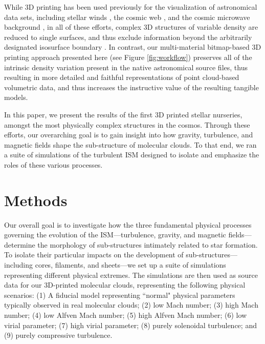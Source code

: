 \documentclass[twocolumn]{aastex63}
\begin{document}
While 3D printing has been used previously for the visualization of astronomical data sets, including stellar winds \citep{Madura_2015}, the cosmic web \citep{Diemer_2017}, and the cosmic microwave background \citep{Clements_2017},  in all of these efforts, complex 3D structures of variable density are reduced to single surfaces, and thus exclude information beyond the arbitrarily designated isosurface boundary \citep{hosny_2018}.  In contrast, our multi-material bitmap-based 3D printing approach presented here (see Figure \ref{fig:workflow}) preserves all of the intrinsic density variation present in the native astronomical source files, thus resulting in more detailed and faithful representations of point cloud-based volumetric data, and thus increases the instructive value of the resulting tangible models.

 
In this paper, we present the results of the first 3D printed stellar nurseries, amongst the most physically complex structures in the cosmos. Through these efforts, our overarching goal is to gain insight into how gravity, turbulence, and magnetic fields shape the sub-structure of molecular clouds.  To that end, we ran a suite of simulations of the turbulent ISM designed to isolate and emphasize the roles of these various processes. 



\section{Methods}\label{sec:methods}

Our overall goal is to investigate how the three fundamental physical processes governing the evolution of the ISM---turbulence, gravity, and magnetic fields---determine the morphology of sub-structures intimately related to star formation.   To isolate their particular impacts on the development of sub-structures---including cores, filaments, and sheets---we set up a suite of simulations representing different physical extremes.   The simulations are then used as source data for our 3D-printed molecular clouds, representing the following physical scenarios: (1) A fiducial model representing ``normal" physical parameters typically observed in real molecular clouds; (2) low Mach number; (3) high Mach number; (4) low Alfven Mach number; (5) high Alfven Mach number; (6) low virial parameter; (7) high virial parameter; (8) purely solenoidal turbulence; and (9) purely compressive turbulence.
\end{document}
